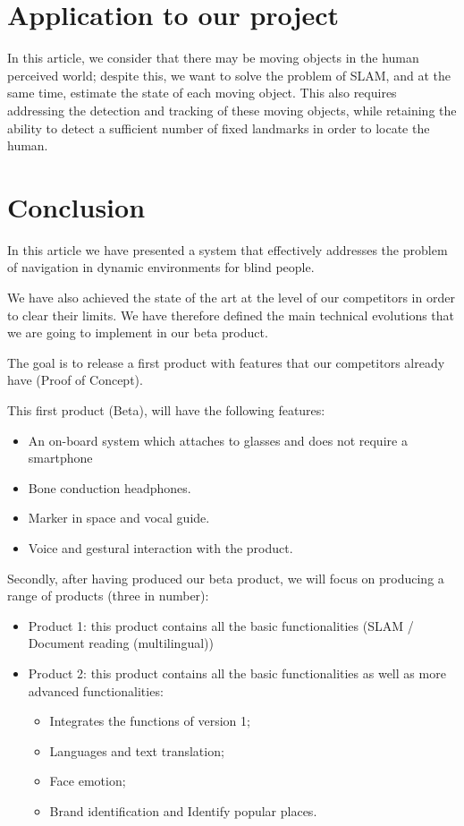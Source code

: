 \documentclass[conference,compsoc]{IEEEtran}
\begin{document}
\section{Application to our project}
In this article, we consider that there may be moving objects in the human perceived world; despite this, we want to solve the problem of SLAM, and at the same time, estimate the state of each moving object. This also requires addressing the detection and tracking of these moving objects, while retaining the ability to detect a sufficient number of fixed landmarks in order to locate the human.


\section{Conclusion}

In this article we have presented a system that effectively addresses the problem of navigation in dynamic environments for blind people.

We have also achieved the state of the art at the level of our competitors in order to clear their limits.
We have therefore defined the main technical evolutions that we are going to implement in our beta product.

The goal is to release a first product with features that our competitors already have (Proof of Concept).

This first product (Beta), will have the following features:
\begin{itemize}
\item An on-board system which attaches to glasses and does not require a smartphone
\item Bone conduction headphones.
\item Marker in space and vocal guide.
\item Voice and gestural interaction with the product.
\end{itemize}

Secondly, after having produced our beta product, we will focus on producing a range of products (three in number):
\begin{itemize}
\item Product 1: this product contains all the basic functionalities (SLAM / Document reading (multilingual))
\item Product 2: this product contains all the basic functionalities as well as more advanced functionalities:
\begin{itemize}
    \item Integrates the functions of version 1;
    \item Languages and text translation;
    \item Face emotion;
    \item Brand identification and Identify popular places.
    \end{itemize}
\end{itemize}





\end{document}
